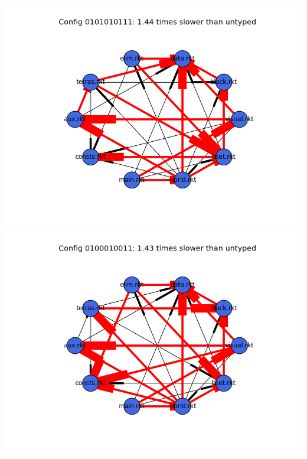 \documentclass{article}
\begin{document}
\begin{itemize}
\includegraphics[width=\textwidth]{tetris-module-graph-0101010111.png}
\includegraphics[width=\textwidth]{tetris-module-graph-0100010011.png}
\end{itemize}
\end{document}
